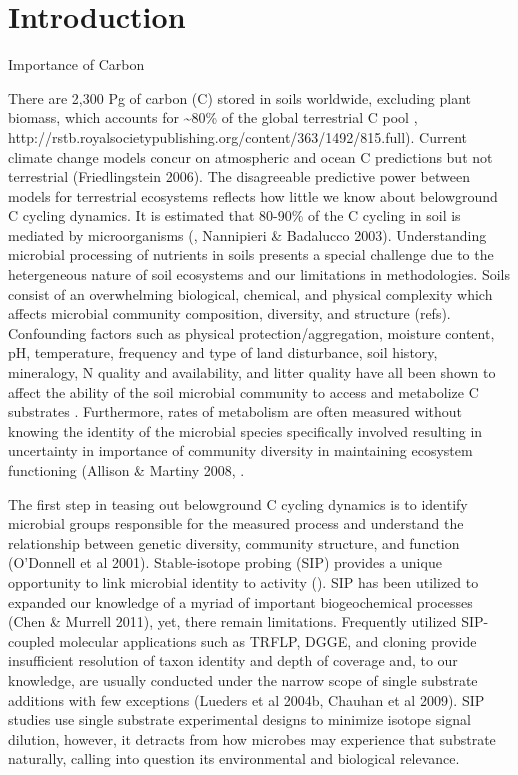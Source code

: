 \section{Introduction}

Importance of Carbon 

There are 2,300 Pg of carbon (C) stored in soils worldwide, excluding plant biomass, which accounts for \sim 80\% of the global terrestrial C pool \cite{Amundson_2001,IPCC 2000,IPCC 2007,elsen_Ayres_Wall_Bardgett_2011,Lal_2008,BATJES_1996}, http://rstb.royalsocietypublishing.org/content/363/1492/815.full).  Current climate change models concur on atmospheric and ocean C predictions but not terrestrial (Friedlingstein 2006).  The disagreeable predictive power between models for terrestrial ecosystems reflects how little we know about belowground C cycling dynamics. It is estimated that 80-90\% of the C cycling in soil is mediated by microorganisms (\cite{ColemanCrossley_1996}, Nannipieri & Badalucco 2003). Understanding microbial processing of nutrients in soils presents a special challenge due to the hetergeneous nature of soil ecosystems and our limitations in methodologies. Soils consist of an overwhelming biological, chemical, and physical complexity which affects microbial community composition, diversity, and structure (refs).  Confounding factors such as physical protection/aggregation, moisture content, pH, temperature, frequency and type of land disturbance, soil history, mineralogy, N quality and availability, and litter quality have all been shown to affect the ability of the soil microbial community to access and metabolize C substrates \cite{Schlesinger_1977,dgett_Wall_Hattenschwiler_2010,Sollins_Homann_Caldwell_1996,Torn_Vitousek_Trumbore_2005,TRUMBORE_2006}. Furthermore, rates of metabolism are often measured without knowing the identity of the microbial species specifically involved \cite{ndi_Pietramellara_Renella_2003} resulting in uncertainty in importance of community diversity in maintaining ecosystem functioning (Allison & Martiny 2008, \cite{ndi_Pietramellara_Renella_2003}. 

The first step in teasing out belowground C cycling dynamics is to identify microbial groups responsible for the measured process and understand the relationship between genetic diversity, community structure, and function (O’Donnell et al 2001). Stable-isotope probing (SIP) provides a unique opportunity to link microbial identity to activity (\cite{Chen_Murrell_2010}). SIP has been utilized to expanded our knowledge of a myriad of important biogeochemical processes (Chen & Murrell 2011), yet, there remain limitations. Frequently utilized SIP-coupled molecular applications such as TRFLP, DGGE, and cloning provide insufficient resolution of taxon identity and depth of coverage and, to our knowledge, are usually conducted under the narrow scope of single substrate additions with few exceptions (Lueders et al 2004b, Chauhan et al 2009). SIP studies use single substrate experimental designs to minimize isotope signal dilution, however, it detracts from how microbes may experience that substrate naturally, calling into question its environmental and biological relevance.

